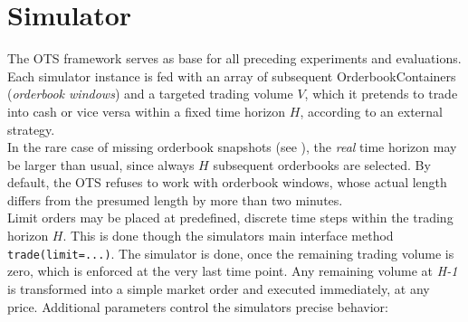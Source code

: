 \section{Simulator}
The \ac{OTS} framework serves as base for all preceding experiments and evaluations.
Each simulator instance is fed with an array of subsequent OrderbookContainers (\emph{orderbook windows}) and a targeted trading volume $V$, which it pretends to trade into cash or vice versa within a fixed time horizon $H$, according to an external strategy.\\

In the rare case of missing orderbook snapshots (see ), the \emph{real} time horizon may be larger than usual, since always $H$ subsequent orderbooks are selected. By default, the \ac{OTS} refuses to work with orderbook windows, whose actual length differs from the presumed length by more than two minutes.\\

Limit orders may be placed at predefined, discrete time steps within the trading horizon $H$. This is done though the simulators main interface method \lstinline!trade(limit=...)!. The simulator is done, once the remaining trading volume is zero, which is enforced at the very last time point. Any remaining volume at \emph{H-1} is transformed into a simple market order and executed immediately, at any price. Additional parameters control the simulators precise behavior:

